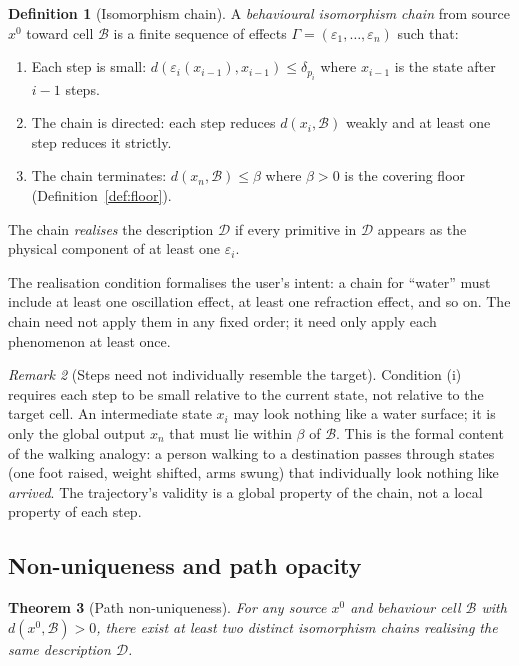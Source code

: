 \documentclass[twocolumn,11pt,a4paper]{article}
\theoremstyle{mee}
\newtheorem{theorem}{Theorem}[section]
\theoremstyle{definition}
\newtheorem{definition}[theorem]{Definition}
\theoremstyle{remark}
\newtheorem{remark}[theorem]{Remark}
\newcommand{\BState}{\mathcal{B}}
\newcommand{\floor}{\beta}
\newcommand{\Eff}{\varepsilon}
\newcommand{\Chain}{\Gamma}
\newcommand{\src}{x^{0}}
\newcommand{\Desc}{\mathcal{D}}
\newcommand{\dist}{d}
\begin{document}
\begin{definition}[Isomorphism chain]
\label{def:chain}
A \emph{behavioural isomorphism chain} from source $\src$ toward cell
$\BState$ is a finite sequence of effects
$\Chain=(\Eff_1,\dots,\Eff_n)$ such that:
\begin{enumerate}[label=(\roman*),leftmargin=1.8em,itemsep=1pt]
\item Each step is small: $\dist(\Eff_i(x_{i-1}), x_{i-1})\le\delta_{p_i}$
  where $x_{i-1}$ is the state after $i-1$ steps.
\item The chain is directed: each step reduces $\dist(x_i, \BState)$
  weakly and at least one step reduces it strictly.
\item The chain terminates: $\dist(x_n, \BState)\le\floor$ where
  $\floor>0$ is the covering floor (Definition~\ref{def:floor}).
\end{enumerate}
The chain \emph{realises} the description $\Desc$ if every primitive in
$\Desc$ appears as the physical component of at least one $\Eff_i$.
\end{definition}

The realisation condition formalises the user's intent: a chain for
``water'' must include at least one oscillation effect, at least one
refraction effect, and so on. The chain need not apply them in any fixed
order; it need only apply each phenomenon at least once.

\begin{remark}[Steps need not individually resemble the target]
\label{rem:subgoal}
Condition (i) requires each step to be small relative to the current
state, not relative to the target cell. An intermediate state $x_i$ may
look nothing like a water surface; it is only the global output $x_n$
that must lie within $\floor$ of $\BState$. This is the formal content of
the walking analogy: a person walking to a destination passes through
states (one foot raised, weight shifted, arms swung) that individually
look nothing like \emph{arrived}. The trajectory's validity is a global
property of the chain, not a local property of each step.
\end{remark}

\subsection{Non-uniqueness and path opacity}

\begin{theorem}[Path non-uniqueness]
\label{thm:nonunique}
For any source $\src$ and behaviour cell $\BState$ with
$\dist(\src,\BState)>0$, there exist at least two distinct isomorphism
chains realising the same description $\Desc$.
\end{theorem}
\end{document}
